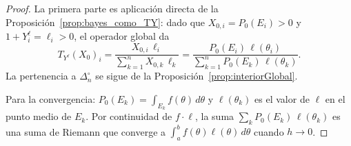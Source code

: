 ﻿\documentclass[12pt]{article}
\begin{document}
\begin{proof}
La primera parte es aplicación directa de la Proposición~\ref{prop:bayes_como_TY}: dado que $X_{0,i}=P_0(E_i)>0$ y $1+Y^\ell_i=\ell_i>0$, el operador global da
\[
T_{Y^\ell}(X_0)_i = \frac{X_{0,i}\,\ell_i}{\sum_{k=1}^n X_{0,k}\,\ell_k} = \frac{P_0(E_i)\,\ell(\theta_i)}{\sum_{k=1}^n P_0(E_k)\,\ell(\theta_k)}.
\]
La pertenencia a $\Delta_n^\circ$ se sigue de la Proposición~\ref{prop:interiorGlobal}.

Para la convergencia: $P_0(E_k)=\int_{E_k}f(\theta)\,d\theta$ y $\ell(\theta_k)$ es el valor de $\ell$ en el punto medio de $E_k$. Por continuidad de $f\cdot\ell$, la suma $\sum_k P_0(E_k)\,\ell(\theta_k)$ es una suma de Riemann que converge a $\int_a^b f(\theta)\ell(\theta)\,d\theta$ cuando $h\to 0$.
\end{proof}
\end{document}
